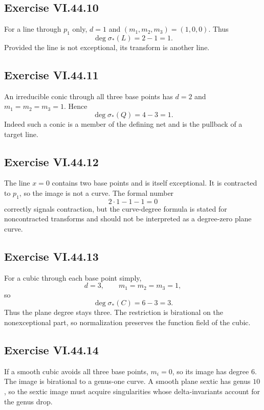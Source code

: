 \subsection*{Exercise VI.44.10}
\begin{solution}
For a line through \(p_1\) only, \(d=1\) and \((m_1,m_2,m_3)=(1,0,0)\).  Thus
\[
\deg\sigma_*(L)=2-1=1.
\]
Provided the line is not exceptional, its transform is another line.
\end{solution}

\subsection*{Exercise VI.44.11}
\begin{solution}
An irreducible conic through all three base points has \(d=2\) and \(m_1=m_2=m_3=1\).  Hence
\[
\deg\sigma_*(Q)=4-3=1.
\]
Indeed such a conic is a member of the defining net and is the pullback of a target line.
\end{solution}

\subsection*{Exercise VI.44.12}
\begin{solution}
The line \(x=0\) contains two base points and is itself exceptional.  It is contracted to \(p_1\), so the image is not a curve.  The formal number
\[
2\cdot1-1-1=0
\]
correctly signals contraction, but the curve-degree formula is stated for noncontracted transforms and should not be interpreted as a degree-zero plane curve.
\end{solution}

\subsection*{Exercise VI.44.13}
\begin{solution}
For a cubic through each base point simply,
\[
d=3,\qquad m_1=m_2=m_3=1,
\]
so
\[
\deg\sigma_*(C)=6-3=3.
\]
Thus the plane degree stays three.  The restriction is birational on the nonexceptional part, so normalization preserves the function field of the cubic.
\end{solution}

\subsection*{Exercise VI.44.14}
\begin{solution}
If a smooth cubic avoids all three base points, \(m_i=0\), so its image has degree \(6\).  The image is birational to a genus-one curve.  A smooth plane sextic has genus \(10\), so the sextic image must acquire singularities whose delta-invariants account for the genus drop.
\end{solution}

